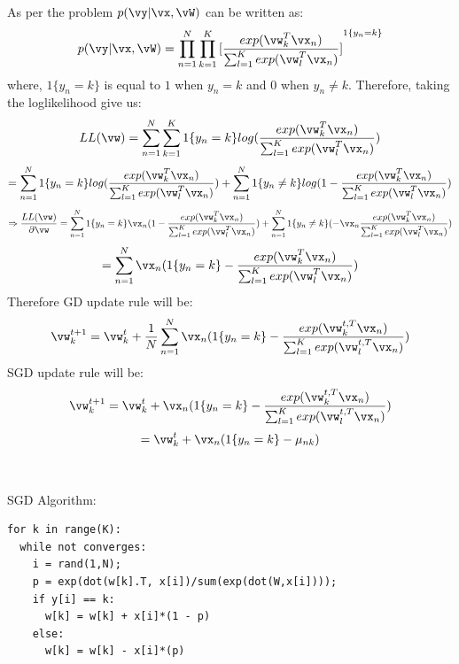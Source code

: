 \documentclass[a4paper,11pt]{article}
\begin{document}
\begin{mlsolution}

\noindent As per the problem $p(\vy|\vx, \vW)$ can be written as:
\begin{equation}
  p(\vy|\vx, \vW) = \prod_{n=1}^{N}\prod_{k=1}^{K}{[\frac{exp(\vw^{T}_{k}\vx_{n})}{\sum_{l=1}^{K}
  exp(\vw^{T}_{l}\vx_{n})}]}^{1\{y_{n}=k\}}
\end{equation}
where, $1\{y_{n}=k\}$ is equal to $1$ when $y_{n}=k$ and $0$ when $y_{n}\neq k$. Therefore, taking the loglikelihood give us:
\begin{equation}
  LL(\vw) = \sum_{n=1}^{N}\sum_{k=1}^{K}1\{y_{n}=k\}log(\frac{exp(\vw^{T}_{k}\vx_{n})}{\sum_{l=1}^{K}exp(\vw^{T}_{l}\vx_{n})})
\end{equation}
\begin{equation}
  = \sum_{n=1}^{N}1\{y_{n}=k\}log(\frac{exp(\vw^{T}_{k}\vx_{n})}{\sum_{l=1}^{K}exp(\vw^{T}_{l}\vx_{n})}) +
  \sum_{n=1}^{N}1\{y_{n}\neq k\}log(1 - \frac{exp(\vw^{T}_{k}\vx_{n})}{\sum_{l=1}^{K}exp(\vw^{T}_{l}\vx_{n})})
\end{equation}
\begin{equation}
  \Rightarrow \frac{LL(\vw)}{\partial \vw} =
  \sum_{n=1}^{N}1\{y_{n}=k\}\vx_{n}(1- \frac{exp(\vw^{T}_{k}\vx_{n})}{\sum_{l=1}^{K}exp(\vw^{T}_{l}\vx_{n})}) +
  \sum_{n=1}^{N}1\{y_{n}\neq k\}(-\vx_{n}\frac{exp(\vw^{T}_{k}\vx_{n})}{\sum_{l=1}^{K}exp(\vw^{T}_{l}\vx_{n})})
\end{equation}
\begin{equation}
  = \sum_{n=1}^{N}\vx_{n}(1\{y_{n}=k\} -\frac{exp(\vw^{T}_{k}\vx_{n})}{\sum_{l=1}^{K}exp(\vw^{T}_{l}\vx_{n})})
\end{equation}
Therefore GD update rule will be:
\begin{equation}
  \vw_{k}^{t+1} = \vw_{k}^{t} + \frac{1}{N}\sum_{n=1}^{N}\vx_{n}(1\{y_{n}=k\} -\frac{exp(\vw^{t,T}_{k}\vx_{n})}{\sum_{l=1}^{K}exp(\vw^{t,T}_{l}\vx_{n})})
\end{equation}
SGD update rule will be:
\begin{equation}
  \vw_{k}^{t+1} = \vw_{k}^{t} + \vx_{n}(1\{y_{n}=k\} -\frac{exp(\vw^{t,T}_{k}\vx_{n})}{\sum_{l=1}^{K}exp(\vw^{t,T}_{l}\vx_{n})})
\end{equation}
\begin{equation}
   = \vw_{k}^{t} + \vx_{n}(1\{y_{n}=k\} - \mu_{nk})
\end{equation}
\\
\\SGD Algorithm:
\begin{lstlisting}
for k in range(K):
  while not converges:
    i = rand(1,N);
    p = exp(dot(w[k].T, x[i])/sum(exp(dot(W,x[i])));
    if y[i] == k:
      w[k] = w[k] + x[i]*(1 - p)
    else:
      w[k] = w[k] - x[i]*(p)


\end{lstlisting}
\end{mlsolution}
\end{document}
